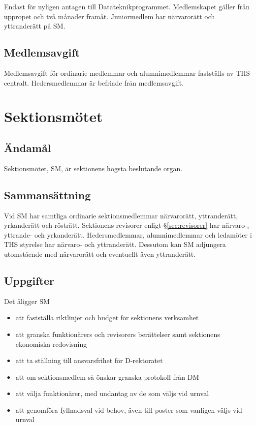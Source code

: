 \documentclass{dgovdoc}
\begin{document}
Endast för nyligen antagen till Datateknikprogrammet. Medlemskapet gäller från
uppropet och två månader framåt. Juniormedlem har närvarorätt och yttranderätt
på SM.

\subsection{Medlemsavgift}

Medlemsavgift för ordinarie medlemmar och alumnimedlemmar fastställs av THS
centralt. Hedersmedlemmar är befriade från medlemsavgift.

\section{Sektionsmötet}

\subsection{Ändamål}

Sektionsmötet, SM, är sektionens högsta beslutande organ.

\subsection{Sammansättning}

Vid SM har samtliga ordinarie sektionsmedlemmar närvarorätt, yttranderätt,
yrkanderätt och rösträtt. Sektionens revisorer enligt \S\ref{sec:revisorer} har
närvaro-, yttrande- och yrkanderätt. Hedersmedlemmar, alumnimedlemmar och
ledamöter i THS styrelse har närvaro- och yttranderätt. Dessutom kan SM
adjungera utomstående med närvarorätt och eventuellt även yttranderätt.

\subsection{Uppgifter}

Det åligger SM

\begin{itemize}
  \item att fastställa riktlinjer och budget för sektionens verksamhet
  \item att granska funktionärers och revisorers berättelser samt sektionens
    ekonomiska redovisning
  \item att ta ställning till ansvarsfrihet för D-rektoratet
  \item att om sektionsmedlem så önskar granska protokoll från DM
  \item att välja funktionärer, med undantag av de som väljs vid urnval
  \item att genomföra fyllnadsval vid behov, även till poster som vanligen
    väljs vid urnval
\end{itemize}
\end{document}
